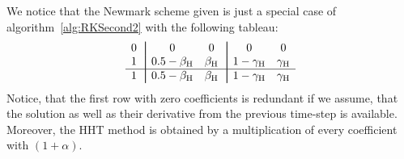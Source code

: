 We notice that the Newmark scheme given is just a special case of algorithm~\ref{alg:RKSecond2}
with the following tableau:
\begin{equation*}
\begin{array}{c|!{\vrule width 0.5pt}cc|!{\vrule width 0.5pt}cc}
0 & 0  & 0 & 0 & 0  \\
1 & 0.5-\beta_\mathrm{H}  & \beta_\mathrm{H}  & 1-\gamma_\mathrm{H} & \gamma_\mathrm{H}  \\
\hline
1 & 0.5-\beta_\mathrm{H}  & \beta_\mathrm{H}  & 1-\gamma_\mathrm{H} & \gamma_\mathrm{H}  \\
\end{array}
\end{equation*}
Notice, that the first row with zero coefficients is redundant if we assume, that the solution as
well as their derivative from the previous time-step is available. Moreover, the HHT
method is obtained by a multiplication of every coefficient with $(1+\alpha)$.
